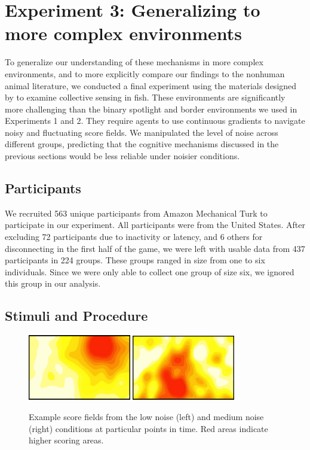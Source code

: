 \documentclass[12pt,letterpaper]{article}
\begin{document}
\section{Experiment 3: Generalizing to more complex environments}

To generalize our understanding of these mechanisms in more complex environments, and to more explicitly compare our findings to the nonhuman animal literature, we conducted a final experiment using the materials designed by  to examine collective sensing in fish.
These environments are significantly more challenging than the binary spotlight and border environments we used in Experiments 1 and 2.
They require agents to use continuous gradients to navigate noisy and fluctuating score fields.
We manipulated the level of noise across different groups, predicting that the cognitive mechanisms discussed in the previous sections would be less reliable under noisier conditions.

\subsection{Participants}
We recruited 563 unique participants from Amazon Mechanical Turk to
participate in our experiment.  All participants were from the United
States.  After excluding 72 participants due to inactivity or latency,
and 6 others for disconnecting in the first half of the game, we were
left with usable data from 437 participants in 224 groups.  These
groups ranged in size from one to six individuals.  Since we were only
able to collect one group of size six, we ignored this group in our
analysis.

\subsection{Stimuli and Procedure}

\begin{figure}
  \centering
  \includegraphics[width=0.4\textwidth]{./figures/easy-field}
  \hspace{0.1cm}
  \includegraphics[width=0.4\textwidth]{./figures/medium-field}
  \caption{Example score fields from the low noise (left) and medium
    noise (right) conditions at particular points in time.  Red areas
    indicate higher scoring areas.}
  \label{fig:score_exp3}
\end{figure}
\end{document}

